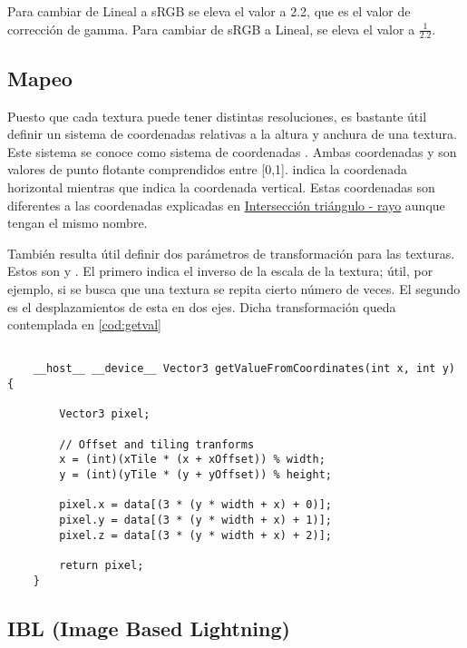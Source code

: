 Para cambiar de Lineal a sRGB se eleva el valor a 2.2, que es el valor de corrección de gamma. Para cambiar de sRGB a Lineal, se eleva el valor a $\frac{1}{2.2}$.
	
	
\subsection{Mapeo}

Puesto que cada textura puede tener distintas resoluciones, es bastante útil definir un sistema de coordenadas relativas a la altura y anchura de una textura. Este sistema se conoce como sistema de coordenadas . Ambas coordenadas  y  son valores de punto flotante comprendidos entre [0,1].  indica la coordenada horizontal mientras que  indica la coordenada vertical. Estas coordenadas son diferentes a las coordenadas  explicadas en \hyperref[subsec:triintersection]{Intersección triángulo - rayo} aunque tengan el mismo nombre.

También resulta útil definir dos parámetros de transformación para las texturas. Estos son  y . El primero indica el inverso de la escala de la textura; útil, por ejemplo, si se busca que una textura se repita cierto número de veces. El segundo es el desplazamientos de esta en dos ejes. Dicha transformación queda contemplada en \autoref{cod:getval}

\begin{minipage}[c]{0.95\textwidth}
\begin{lstlisting}[label={cod:getval}, caption={Código para obtener valor de una textura.}]
	
	__host__ __device__ Vector3 getValueFromCoordinates(int x, int y) {
	
        Vector3 pixel;

        // Offset and tiling tranforms
        x = (int)(xTile * (x + xOffset)) % width;
        y = (int)(yTile * (y + yOffset)) % height;

        pixel.x = data[(3 * (y * width + x) + 0)];
        pixel.y = data[(3 * (y * width + x) + 1)];
        pixel.z = data[(3 * (y * width + x) + 2)];

        return pixel;
    }
\end{lstlisting}
\end{minipage}

\subsection{IBL (Image Based Lightning)}
	
